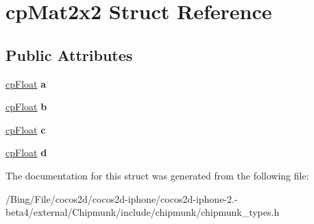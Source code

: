 \hypertarget{structcp_mat2x2}{\section{cp\-Mat2x2 Struct Reference}
\label{structcp_mat2x2}
}
\subsection*{Public Attributes}
\begin{DoxyCompactItemize}
\item 
\hypertarget{structcp_mat2x2_a3f392cee2281ef681ea192e22dae75fa}{\hyperlink{group__basic_types_gac1ed65573e035bf892505768c852d8d3}{cp\-Float} {\bfseries a}}\label{structcp_mat2x2_a3f392cee2281ef681ea192e22dae75fa}

\item 
\hypertarget{structcp_mat2x2_a633387544257634501d1b8d3d3b7cb01}{\hyperlink{group__basic_types_gac1ed65573e035bf892505768c852d8d3}{cp\-Float} {\bfseries b}}\label{structcp_mat2x2_a633387544257634501d1b8d3d3b7cb01}

\item 
\hypertarget{structcp_mat2x2_aa64133ad4fce658b0ccd4626ca021b45}{\hyperlink{group__basic_types_gac1ed65573e035bf892505768c852d8d3}{cp\-Float} {\bfseries c}}\label{structcp_mat2x2_aa64133ad4fce658b0ccd4626ca021b45}

\item 
\hypertarget{structcp_mat2x2_a326abf4082ad424f8911f54c42a0e85c}{\hyperlink{group__basic_types_gac1ed65573e035bf892505768c852d8d3}{cp\-Float} {\bfseries d}}\label{structcp_mat2x2_a326abf4082ad424f8911f54c42a0e85c}

\end{DoxyCompactItemize}


The documentation for this struct was generated from the following file\-:\begin{DoxyCompactItemize}
\item 
/\-Bing/\-File/cocos2d/cocos2d-\/iphone/cocos2d-\/iphone-\/2.-\/beta4/external/\-Chipmunk/include/chipmunk/chipmunk\-\_\-types.\-h\end{DoxyCompactItemize}
